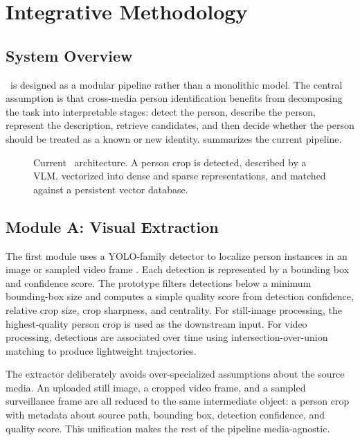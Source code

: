 \chapter{Integrative Methodology}
\label{ch:integrative-methodology}

\section{System Overview}

\systemname\ is designed as a modular pipeline rather than a monolithic model. The central assumption is that cross-media person identification benefits from decomposing the task into interpretable stages: detect the person, describe the person, represent the description, retrieve candidates, and then decide whether the person should be treated as a known or new identity.  summarizes the current pipeline.

\begin{figure}[htbp]
  \centering
  
  \caption{Current \systemname\ architecture. A person crop is detected, described by a VLM, vectorized into dense and sparse representations, and matched against a persistent vector database.}
  \label{fig:system-architecture}
\end{figure}

\section{Module A: Visual Extraction}

The first module uses a YOLO-family detector to localize person instances in an image or sampled video frame \citep{redmon2016you,jocher2023ultralytics}. Each detection is represented by a bounding box and confidence score. The prototype filters detections below a minimum bounding-box size and computes a simple quality score from detection confidence, relative crop size, crop sharpness, and centrality. For still-image processing, the highest-quality person crop is used as the downstream input. For video processing, detections are associated over time using intersection-over-union matching to produce lightweight trajectories.

The extractor deliberately avoids over-specialized assumptions about the source media. An uploaded still image, a cropped video frame, and a sampled surveillance frame are all reduced to the same intermediate object: a person crop with metadata about source path, bounding box, detection confidence, and quality score. This unification makes the rest of the pipeline media-agnostic.

